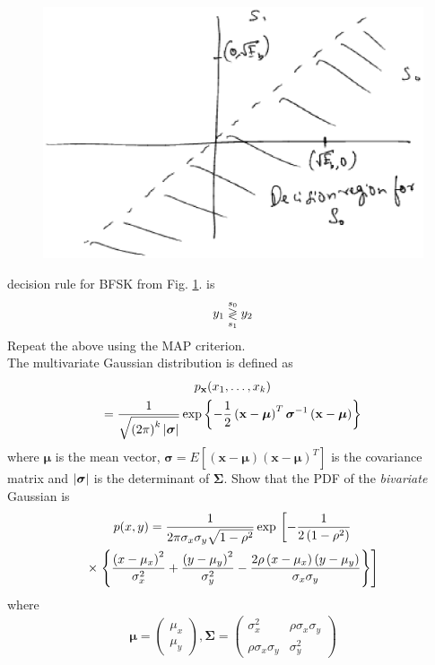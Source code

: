\documentclass[10pt, a4paper]{article}
\providecommand{\sbrak}[1]{\ensuremath{{}\left[#1\right]}}
\providecommand{\brak}[1]{\ensuremath{\left(#1\right)}}
\begin{document}
\begin{enumerate}
\begin{figure}[!h]
\centering
\includegraphics[width=\columnwidth]{bfsk_const.eps}
\caption{}
\label{fig:bfsk_const}
\end{figure}
decision rule for BFSK from Fig. \ref{fig:bfsk_const}. is
\begin{equation}
y_1 \overset{s_0}{\underset{s_1}{\gtrless}} y_2
\end{equation}
Repeat the above using the MAP criterion.\\
\solution 
 The multivariate Gaussian distribution is defined as
%
\begin{multline}
\label{eq:multivariate}
p_{\mathbf{x}}(x_1,\dots,x_k)
\\
=\frac{1}{\sqrt{\brak{2\pi}^k\abs{\bm{\sigma}}}}\exp\cbrak{-\frac{1}{2}\brak{\mathbf{x}-\bm{\mu}}^T\bm{\sigma}^{-1}\brak{\mathbf{x}-\bm{\mu}}}
\end{multline}
%
where $\bm{\mu}$ is the mean vector, $\bm{\sigma} = E\sbrak{\brak{\mathbf{x}-\bm{\mu}}\brak{\mathbf{x}-\bm{\mu}}^T}$ is the covariance matrix and $\vert\bm{\sigma}\vert$ is the determinant of $\bm{\Sigma}$.
Show that the PDF of the {\em bivariate} Gaussian is
{\small
\begin{multline}
\label{eq:bivariate}
p(x,y)= \frac{1}{2\pi \sigma_x\sigma_y\sqrt{1-\rho^2}}\exp\lsbrak{-\frac{1}{2\brak{1-\rho^2}}}
\\
\times \rsbrak{\cbrak{\frac{\brak{x-\mu_x}^2}{\sigma_x^2}+\frac{\brak{y-\mu_y}^2}{\sigma_y^2}-\frac{2\rho\brak{x-\mu_x}\brak{y-\mu_y}}{\sigma_x\sigma_y}}}
\end{multline}
}
%
where
%
\begin{align}
\bm{\mu}=
\begin{pmatrix}
\mu_x \\
\mu_y
\end{pmatrix},
\bm{\Sigma} = 
\begin{pmatrix}%
\sigma_x^2 & \rho\sigma_x\sigma_y \\
\rho\sigma_x\sigma_y & \sigma_y^2
\end{pmatrix}
\end{align}


\end{enumerate}
\end{document}
